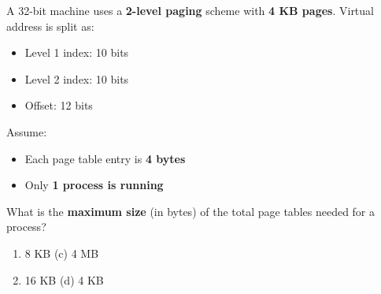 A 32-bit machine uses a \textbf{2-level paging} scheme with \textbf{4 KB pages}. Virtual address is split as:

\begin{itemize}
    \item Level 1 index: 10 bits
    \item Level 2 index: 10 bits
    \item Offset: 12 bits
\end{itemize}

Assume:
\begin{itemize}
    \item Each page table entry is \textbf{4 bytes}
    \item Only \textbf{1 process is running}
\end{itemize}

What is the \textbf{maximum size} (in bytes) of the total page tables needed for a process?

\begin{enumerate}[label=(\alph*)]
    \item 8 KB  \hspace{5cm} (c) 4 MB
    \item 16 KB \hspace{5cm} (d) 4 KB
\end{enumerate}


\newpage
